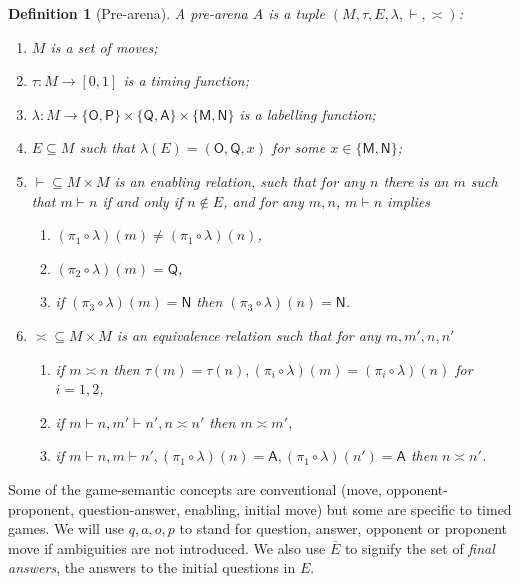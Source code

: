 \documentclass{article}
\newtheorem{definition}[theorem]{Definition}
\newcommand{\mv}[1]{\mathsf{#1}}
\begin{document}
\begin{definition}[Pre-arena]\label{def:prota}
A \emph{pre-arena} $A$ is a tuple $(M,\tau,E,\lambda,\vdash,{\asymp})$:
\begin{enumerate}
\item \label{i:moves}
 $M$ is a set of \emph{moves};
\item \label{i:timing}
$\tau: M\rightarrow [0,1]$ is a  \emph{timing function};
\item \label{i:label}
$\lambda:M\rightarrow \{\mv O,\mv P\}\times\{\mv Q, \mv A\}\times \{\mv M,\mv N\}$ is a \emph{labelling function};
\item \label{i:initial}
$E\subseteq M$ such that $\lambda(E)=(\mv O,\mv Q, x)$ for some $x\in\{\mv M, \mv N \}$;
\item \label{i:enable}
${\vdash}\subseteq M\times M$ is an \emph{enabling relation}, such that for any $n$ there is an $m$ such that $m\vdash n$ if and only if $n\not\in E$, and for any $m, n$, $m\vdash n$ implies 
\begin{enumerate}
\item \label{i:oqenable}
$(\pi_1\circ\lambda)(m)\not= (\pi_1\circ\lambda)(n)$,
\item \label{i:qenable}
$(\pi_2\circ\lambda)(m)=\mv Q$, 
\item \label{i:placehold}
if $(\pi_3\circ\lambda)(m)=\mv N$ then $(\pi_3\circ\lambda)(n)=\mv N$.
\end{enumerate}
\item \label{i:simult}
${\asymp}\subseteq M\times M$ is an equivalence relation such that for any $m, m', n, n'$ 
\begin{enumerate}
\item \label{i:simtim}
if $m\asymp n$ then $\tau(m)=\tau(n), (\pi_i\circ\lambda)(m)=(\pi_i\circ\lambda)(n)$ for $i=1,2$,
\item \label{i:simjus}
if $m\vdash n, m'\vdash n', n\asymp n'$ then $m\asymp m'$,
\item \label{i:simena}
if $m\vdash n, m\vdash n', (\pi_1\circ\lambda)(n)=\mv A, (\pi_1\circ\lambda)(n')=\mv A$ then $n\asymp n'$.
\end{enumerate}
\end{enumerate}
\end{definition}
Some of the game-semantic concepts are conventional (move, opponent-proponent, question-answer, enabling, initial move) but some are specific to timed games. We will use $q, a, o, p$ to stand for question, answer, opponent or proponent move if ambiguities are not introduced. We also use $\overline E$ to signify the set of \emph{final answers}, the answers to the initial questions in $E$.
\end{document}
